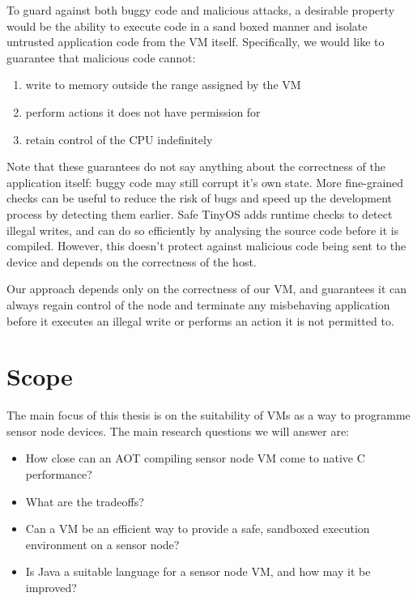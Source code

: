 To guard against both buggy code and malicious attacks, a desirable property would be the ability to execute code in a sand boxed manner and isolate untrusted application code from the VM itself. Specifically, we would like to guarantee that malicious code cannot:
\begin{enumerate}
	\item write to memory outside the range assigned by the VM
	\item perform actions it does not have permission for
	\item retain control of the CPU indefinitely
\end{enumerate}

Note that these guarantees do not say anything about the correctness of the application itself: buggy code may still corrupt it's own state. More fine-grained checks can be useful to reduce the risk of bugs and speed up the development process by detecting them earlier. Safe TinyOS \cite{Cooprider:2007ub} adds runtime checks to detect illegal writes, and can do so efficiently by analysing the source code before it is compiled. However, this doesn't protect against malicious code being sent to the device and depends on the correctness of the host.

Our approach depends only on the correctness of our VM, and guarantees it can always regain control of the node and terminate any misbehaving application before it executes an illegal write or performs an action it is not permitted to.


\section{Scope}
The main focus of this thesis is on the suitability of VMs as a way to programme sensor node devices. The main research questions we will answer are:
\begin{itemize}
	\item How close can an AOT compiling sensor node VM come to native C performance?
	\item What are the tradeoffs?
	\item Can a VM be an efficient way to provide a safe, sandboxed execution environment on a sensor node?
	\item Is Java a suitable language for a sensor node VM, and how may it be improved?
\end{itemize}

